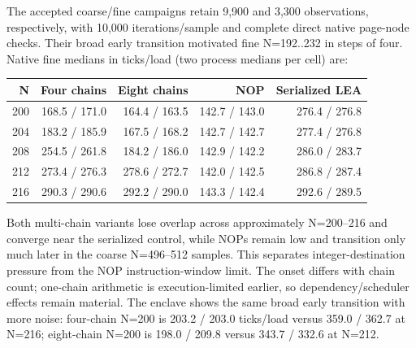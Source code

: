 \documentclass[11pt]{article}
\begin{document}
The accepted coarse/fine campaigns retain 9,900 and 3,300 observations, respectively, with 10,000 iterations/sample and complete direct native page-node checks. Their broad early transition motivated fine N=192..232 in steps of four. Native fine medians in ticks/load (two process medians per cell) are:
\begin{center}\begin{tabular}{rrrrr}
N & Four chains & Eight chains & NOP & Serialized LEA\\\hline
200 & 168.5 / 171.0 & 164.4 / 163.5 & 142.7 / 143.0 & 276.4 / 276.8\\
204 & 183.2 / 185.9 & 167.5 / 168.2 & 142.7 / 142.7 & 277.4 / 276.8\\
208 & 254.5 / 261.8 & 184.2 / 186.0 & 142.9 / 142.2 & 286.0 / 283.7\\
212 & 273.4 / 276.3 & 278.6 / 272.7 & 142.0 / 142.5 & 286.8 / 287.4\\
216 & 290.3 / 290.6 & 292.2 / 290.0 & 143.3 / 142.4 & 292.6 / 289.5
\end{tabular}\end{center}
Both multi-chain variants lose overlap across approximately N=200--216 and converge near the serialized control, while NOPs remain low and transition only much later in the coarse N=496--512 samples. This separates integer-destination pressure from the NOP instruction-window limit. The onset differs with chain count; one-chain arithmetic is execution-limited earlier, so dependency/scheduler effects remain material. The enclave shows the same broad early transition with more noise: four-chain N=200 is 203.2 / 203.0 ticks/load versus 359.0 / 362.7 at N=216; eight-chain N=200 is 198.0 / 209.8 versus 343.7 / 332.6 at N=212.
\end{document}

